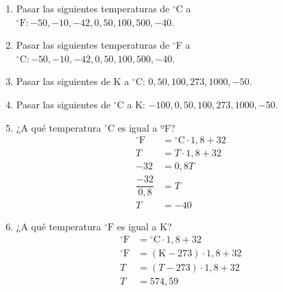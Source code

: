 \begin{enumerate}
\item Pasar las siguientes temperaturas de $^\circ$C a $^\circ\text{F}: -50, -10, -42, 0, 50, 100, 500, -40$.

\item Pasar las siguientes temperaturas de $^\circ$F a $^\circ\text{C}: -50, -10, -42, 0, 50, 100, 500, -40$.

\item Pasar las siguientes de K a $^\circ$C: $0, 50, 100, 273, 1000, -50$.

\item Pasar las siguientes de $^\circ$C a K: $-100, 0, 50, 100, 273, 1000, -50$.

\item ¿A qué temperatura $\text{$^\circ$C}$ es igual a ºF?
\begin{align*}
    ^\circ\text{F}&= \text{$^\circ$C} \cdot 1,8 + 32\\
    T &= T \cdot 1,8 + 32\\
    -32 &= 0,8 T\\
    \dfrac{-32}{0,8} &= T\\
    T &= -40
\end{align*}

\item ¿A qué temperatura $\text{$^\circ$F}$ es igual a K?
\begin{align*}
    ^\circ\text{F}&= \text{$^\circ$C} \cdot 1,8 + 32\\
    ^\circ\text{F}&= (\text{K}-273) \cdot 1,8 + 32\\
    T&= (T-273) \cdot 1,8 + 32\\
    T &= 574,59
\end{align*}
\end{enumerate}
